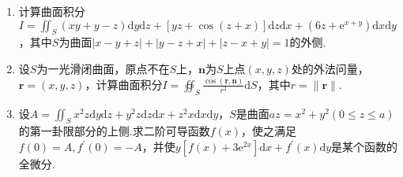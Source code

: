 \begin{enumerate}
	\item 计算曲面积分$I=\iint_{S}(x y+y-z) \mathrm{d} y \mathrm{d} z+[y z+\cos (z+x)] \mathrm{d} z \mathrm{d} x+\left(6 z+\mathrm{e}^{x+y}\right) \mathrm{d} x \mathrm{d} y$，其中$S$为曲面$|x-y+z|+|y-z+x|+|z-x+y|=1$的外侧.
	\item 设$S$为一光滑闭曲面，原点不在$S$上，$\boldsymbol{n}$为$S$上点$(x,y,z)$处的外法问量，$\boldsymbol{r}=(x, y, z)$，计算曲面积分$I=\oiint_{S} \frac{\cos (\boldsymbol{r}, \boldsymbol{n})}{r^{2}} \mathrm{d} S$，其中$r=\|\boldsymbol{r}\|$.
	
	\item 设$A=\iint_{S} x^{2} z \mathrm{d} y \mathrm{d} z+y^{2} z \mathrm{d} z \mathrm{d} x+z^{2} x \mathrm{d} x \mathrm{d} y$，$S$是曲面$a z=x^{2}+y^{2}(0 \leqslant z \leqslant a)$的第一卦限部分的上侧.求二阶可导函数$f(x)$，使之满足$f(0)=A, f^{\prime}(0)=-A$，并使$y\left[f(x)+3 \mathrm{e}^{2 x}\right] \mathrm{d} x+f^{\prime}(x) \mathrm{d} y$是某个函数的全微分.	
	
	
	
\end{enumerate}